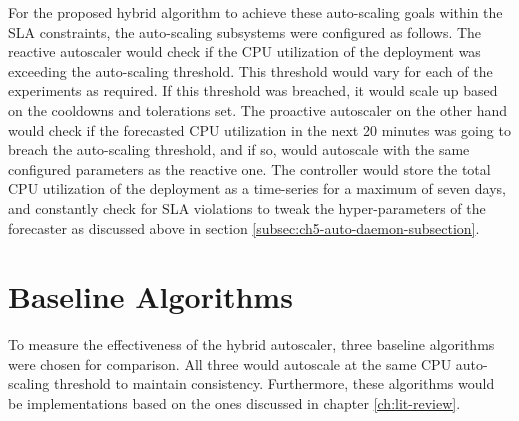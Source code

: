 For the proposed hybrid algorithm to achieve these auto-scaling goals within the SLA constraints, the auto-scaling subsystems were configured as follows. The reactive autoscaler would check if the CPU utilization of the deployment was exceeding the auto-scaling threshold. This threshold would vary for each of the experiments as required. If this threshold was breached, it would scale up based on the cooldowns and tolerations set. The proactive autoscaler on the other hand would check if the forecasted CPU utilization in the next 20 minutes was going to breach the auto-scaling threshold, and if so, would autoscale with the same configured parameters as the reactive one. The controller would store the total CPU utilization of the deployment as a time-series for a maximum of seven days, and constantly check for SLA violations to tweak the hyper-parameters of the forecaster as discussed above in section \ref{subsec:ch5-auto-daemon-subsection}.\par

\section{Baseline Algorithms}
\label{sec:ch6-baseline-algos}

To measure the effectiveness of the hybrid autoscaler, three baseline algorithms were chosen for comparison. All three would autoscale at the same CPU auto-scaling threshold to maintain consistency. Furthermore, these algorithms would be implementations based on the ones discussed in chapter \ref{ch:lit-review}.\par

